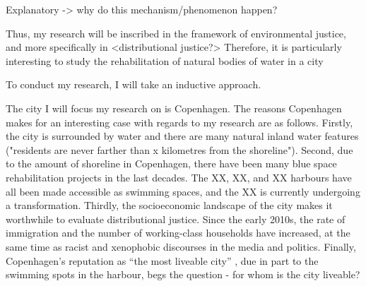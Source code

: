 \documentclass{article}
\begin{document}
 Explanatory -> why do this mechanism/phenomenon happen? 


Thus, my research will be inscribed in the framework of environmental justice, and more specifically in <distributional justice?>
Therefore, it is particularly interesting to study the rehabilitation of natural bodies of water in a city 

To conduct my research, I will take an inductive approach. 










The city I will focus my research on is Copenhagen.
The reasons Copenhagen makes for an interesting case with regards to my research are as follows. Firstly, the city is surrounded by water and there are many natural inland water features ("residents are never farther than x kilometres from the shoreline"). 
Second, due to the amount of shoreline in Copenhagen, there have been many blue space rehabilitation projects in the last decades. The XX, XX, and XX harbours have all been made accessible as swimming spaces, and the XX is currently undergoing a transformation.
Thirdly, the socioeconomic landscape of the city makes it worthwhile to evaluate distributional justice. Since the early 2010s, the rate of immigration and the number of working-class households have increased, at the same time as racist and xenophobic discourses in the media and politics. 
Finally, Copenhagen's reputation as ``the most liveable city'' \parencite{visitdenmark_2021}, due in part to the swimming spots in the harbour, begs the question - for whom is the city liveable?



\printbibliography
\end{document}
